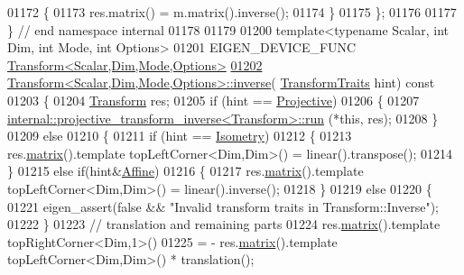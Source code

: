 \begin{DoxyCode}
01172   \{
01173     res.matrix() = m.matrix().inverse();
01174   \}
01175 \};
01176 
01177 \} \textcolor{comment}{// end namespace internal}
01178 
01179 
01200 \textcolor{keyword}{template}<\textcolor{keyword}{typename} Scalar, \textcolor{keywordtype}{int} Dim, \textcolor{keywordtype}{int} Mode, \textcolor{keywordtype}{int} Options>
01201 EIGEN\_DEVICE\_FUNC \hyperlink{group___geometry___module_class_eigen_1_1_transform}{Transform<Scalar,Dim,Mode,Options>}
\hyperlink{group___geometry___module_a20ca137b84f18b9c41a0fef9c222e0da}{01202} \hyperlink{group___geometry___module_a20ca137b84f18b9c41a0fef9c222e0da}{Transform<Scalar,Dim,Mode,Options>::inverse}(
      \hyperlink{group__enums_gaee59a86102f150923b0cac6d4ff05107}{TransformTraits} hint)\textcolor{keyword}{ const}
01203 \textcolor{keyword}{}\{
01204   \hyperlink{group___geometry___module_class_eigen_1_1_transform}{Transform} res;
01205   \textcolor{keywordflow}{if} (hint == \hyperlink{group__enums_ggaee59a86102f150923b0cac6d4ff05107aead6a2de12a17aaa4f5c523215dfccad}{Projective})
01206   \{
01207     \hyperlink{struct_eigen_1_1internal_1_1projective__transform__inverse}{internal::projective\_transform\_inverse<Transform>::run}
      (*\textcolor{keyword}{this}, res);
01208   \}
01209   \textcolor{keywordflow}{else}
01210   \{
01211     \textcolor{keywordflow}{if} (hint == \hyperlink{group__enums_ggaee59a86102f150923b0cac6d4ff05107a080cd5366173608f701cd945c2335568}{Isometry})
01212     \{
01213       res.\hyperlink{group___geometry___module_aec8168000a88a807130d41020af98d47}{matrix}().template topLeftCorner<Dim,Dim>() = linear().transpose();
01214     \}
01215     \textcolor{keywordflow}{else} \textcolor{keywordflow}{if}(hint&\hyperlink{group__enums_ggaee59a86102f150923b0cac6d4ff05107a71e768e0581725d919d0b05f4cb83234}{Affine})
01216     \{
01217       res.\hyperlink{group___geometry___module_aec8168000a88a807130d41020af98d47}{matrix}().template topLeftCorner<Dim,Dim>() = linear().inverse();
01218     \}
01219     \textcolor{keywordflow}{else}
01220     \{
01221       eigen\_assert(\textcolor{keyword}{false} && \textcolor{stringliteral}{"Invalid transform traits in Transform::Inverse"});
01222     \}
01223     \textcolor{comment}{// translation and remaining parts}
01224     res.\hyperlink{group___geometry___module_aec8168000a88a807130d41020af98d47}{matrix}().template topRightCorner<Dim,1>()
01225       = - res.\hyperlink{group___geometry___module_aec8168000a88a807130d41020af98d47}{matrix}().template topLeftCorner<Dim,Dim>() * translation();

\end{DoxyCode}
